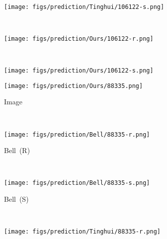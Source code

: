 \documentclass[10pt,twocolumn,letterpaper]{article}
\begin{document}
\begin{figure*}[ptb]
    ~    
    \begin{subfigure}[b]{0.135\textwidth}
        \texttt{[image: figs/prediction/Tinghui/106122-s.png]}
    \end{subfigure}   \hspace*{-0.8em}
    ~
    \begin{subfigure}[b]{0.135\textwidth}
        \texttt{[image: figs/prediction/Ours/106122-r.png]}
    \end{subfigure}   \hspace*{-0.8em}
    ~    
    \begin{subfigure}[b]{0.135\textwidth}
        \texttt{[image: figs/prediction/Ours/106122-s.png]}
    \end{subfigure}   
	 \begin{subfigure}[b]{0.135\textwidth}
        \texttt{[image: figs/prediction/Ours/88335.png]}
         \caption{Image}  \vspace{-0.1em}
    \end{subfigure} \hspace*{-0.8em}
    ~
    \begin{subfigure}[b]{0.135\textwidth}
        \texttt{[image: figs/prediction/Bell/88335-r.png]}
         \caption{Bell~\etal (R)}  \vspace{-0.1em}
    \end{subfigure} \hspace*{-0.8em}
    ~
    \begin{subfigure}[b]{0.135\textwidth}
        \texttt{[image: figs/prediction/Bell/88335-s.png]}
		\caption{Bell~\etal (S)}  \vspace{-0.1em}
    \end{subfigure} \hspace*{-0.8em}
    ~
    \begin{subfigure}[b]{0.135\textwidth}
        \texttt{[image: figs/prediction/Tinghui/88335-r.png]}

\end{subfigure}
\end{figure*}
\end{document}
